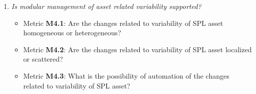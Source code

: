\begin{enumerate}[Q1]
\item \emph{Is modular management of asset related variability supported?}
\begin{itemize}
\item Metric \textbf{M4.1}: Are the changes related to variability of SPL asset homogeneous or heterogeneous?
\item Metric \textbf{M4.2}: Are the changes related to variability of SPL asset localized or scattered?
\item Metric \textbf{M4.3}: What is the possibility of automation of the changes related to variability of SPL asset?
\end{itemize}
\end{enumerate}

